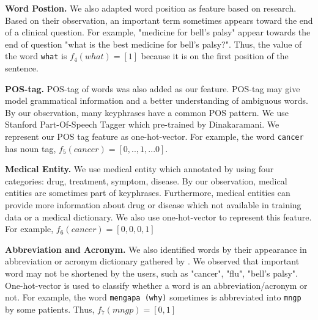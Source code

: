     \textbf{Word Postion.} We also adapted word position as feature based on \cite{cao2010automatically}research. Based on their observation, an important term sometimes appears toward the end of a clinical question. For example, "medicine for bell's palsy" appear towards the end of question "what is the best medicine for bell's palsy?". Thus, the value of the word \texttt{what} is $f_4(what) = [1]$ because it is on the first position of the sentence.
    
    \textbf{POS-tag.} POS-tag of words was also added as our feature. POS-tag may give model grammatical information and a better understanding of ambiguous words. By our observation, many keyphrases have a common POS pattern. We use Stanford Part-Of-Speech Tagger which pre-trained by Dinakaramani\cite{dinakaramani2014designing}. We represent our POS tag feature as one-hot-vector. For example, the word \texttt{cancer} has noun tag, $f_5(cancer) = [0, ..,1, ...0]$.
    
    \textbf{Medical Entity.} We use medical entity which annotated by \cite{skripsiWahid} using four categories: drug, treatment, symptom, disease. By our observation, medical entities are sometimes part of keyphrases. Furthermore, medical entities can provide more information about drug or disease which not available in training data or a medical dictionary. We also use one-hot-vector to represent this feature. For example, $f_6(cancer) = [0, 0, 0 ,1]$
    
    \textbf{Abbreviation and Acronym.} We also identified words by their appearance in abbreviation or acronym dictionary gathered by \cite{skripsiKakAbid}. We observed that important word may not be shortened by the users, such as "cancer", "flu", "bell’s palsy". One-hot-vector is used to classify whether a word is an abbreviation/acronym or not. For example, the word \texttt{mengapa (why)} sometimes is abbreviated into \texttt{mngp} by some patients. Thus, $f_7(mngp) = [0, 1]$ 
    
